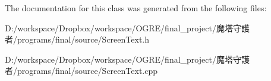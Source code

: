 The documentation for this class was generated from the following files:\begin{DoxyCompactItemize}
\item 
D:/workspace/Dropbox/workspace/OGRE/final\_\-project/魔塔守護者/programs/final/source/ScreenText.h\item 
D:/workspace/Dropbox/workspace/OGRE/final\_\-project/魔塔守護者/programs/final/source/ScreenText.cpp\end{DoxyCompactItemize}
